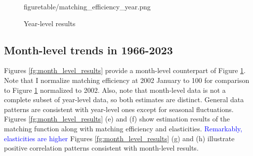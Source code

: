 \documentclass[12pt]{article}
\begin{document}
\begin{figure}[!ht]
\begin{center}
{  {figuretable/matching_efficiency_year.png}}
  \\
  \caption{Year-level results}
  \label{fg:year_level_results} 
  \end{center}
  \footnotesize
\end{figure} 


\subsection{Month-level trends in 1966-2023}

Figures \ref{fg:month_level_results} provide a month-level counterpart of Figure \ref{fg:year_level_results}. 
Note that I normalize matching efficiency at 2002 January to 100 for comparison to Figure \ref{fg:year_level_results} normalized to 2002. 
Also, note that month-level data is not a complete subset of year-level data, so both estimates are distinct.
General data patterns are consistent with year-level ones except for seasonal fluctuations.
Figures \ref{fg:month_level_results} (e) and (f) show estimation results of the matching function along with matching efficiency and elasticities.
\textcolor{blue}{
Remarkably, elasticities are higher}
Figures \ref{fg:month_level_results} (g) and (h) illustrate positive correlation patterns consistent with month-level results.
\end{document}
